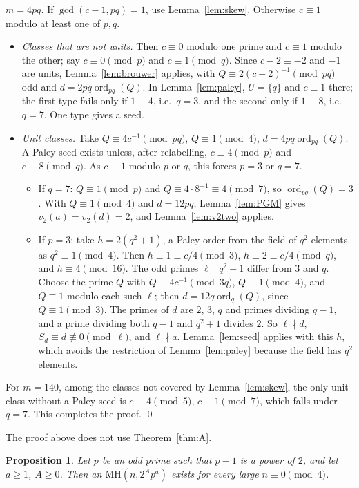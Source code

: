 \documentclass[10pt]{article}
\newtheorem{proposition}[lemma]{Proposition}
\theoremstyle{remark}
\newcommand{\MH}{\mathrm{MH}}
\newcommand{\ord}{\operatorname{ord}}
\begin{document}
\emph{$m=4pq$.} If $\gcd(c-1,pq)=1$, use Lemma~\ref{lem:skew}. Otherwise $c\equiv1$ modulo at least one of $p,q$.
\begin{itemize}
\item \emph{Classes that are not units.} Then $c\equiv0$ modulo one prime and $c\equiv1$ modulo the other; say $c\equiv0\pmod p$ and $c\equiv1\pmod q$. Since $c-2\equiv-2$ and $-1$ are units, Lemma~\ref{lem:brouwer} applies, with $Q\equiv2(c-2)^{-1}\pmod{pq}$ odd and $d=2pq\ord_{pq}(Q)$. In Lemma~\ref{lem:paley}, $U=\{q\}$ and $c\equiv1$ there; the first type fails only if $1\equiv4$, i.e.\ $q=3$, and the second only if $1\equiv8$, i.e.\ $q=7$. One type gives a seed.
\item \emph{Unit classes.} Take $Q\equiv4c^{-1}\pmod{pq}$, $Q\equiv1\pmod4$, $d=4pq\ord_{pq}(Q)$. A Paley seed exists unless, after relabelling, $c\equiv4\pmod p$ and $c\equiv8\pmod q$. As $c\equiv1$ modulo $p$ or $q$, this forces $p=3$ or $q=7$.
\begin{itemize}
\item[--] If $q=7$: $Q\equiv1\pmod p$ and $Q\equiv4\cdot8^{-1}\equiv4\pmod7$, so $\ord_{pq}(Q)=3$. With $Q\equiv1\pmod4$ and $d=12pq$, Lemma~\ref{lem:PGM} gives $v_2(a)=v_2(d)=2$, and Lemma~\ref{lem:v2two} applies.
\item[--] If $p=3$: take $h=2(q^2+1)$, a Paley order from the field of $q^2$ elements, as $q^2\equiv1\pmod4$. Then $h\equiv1\equiv c/4\pmod3$, $h\equiv2\equiv c/4\pmod q$, and $h\equiv4\pmod{16}$. The odd primes $\ell\mid q^2+1$ differ from $3$ and $q$. Choose the prime $Q$ with $Q\equiv4c^{-1}\pmod{3q}$, $Q\equiv1\pmod4$, and $Q\equiv1$ modulo each such $\ell$; then $d=12q\ord_q(Q)$, since $Q\equiv1\pmod3$. The primes of $d$ are $2$, $3$, $q$ and primes dividing $q-1$, and a prime dividing both $q-1$ and $q^2+1$ divides $2$. So $\ell\nmid d$, $S_d\equiv d\not\equiv0\pmod\ell$, and $\ell\nmid a$. Lemma~\ref{lem:seed} applies with this $h$, which avoids the restriction of Lemma~\ref{lem:paley} because the field has $q^2$ elements.
\end{itemize}
\end{itemize}
For $m=140$, among the classes not covered by Lemma~\ref{lem:skew}, the only unit class without a Paley seed is $c\equiv4\pmod5$, $c\equiv1\pmod7$, which falls under $q=7$. This completes the proof. \qed

The proof above does not use Theorem~\ref{thm:A}.

\begin{proposition}\label{prop:fermat}
Let $p$ be an odd prime such that $p-1$ is a power of $2$, and let $a\ge1$, $A\ge0$. Then an $\MH(n,2^Ap^a)$ exists for every large $n\equiv0\pmod4$.
\end{proposition}
\end{document}
